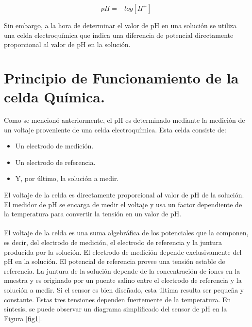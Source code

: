 \documentclass[10pt,a4paper]{article}
\begin{document}
\begin{equation}
	pH = -log\left[H^+\right]
\end{equation}

Sin embargo, a la hora de determinar el valor de pH en una solución se utiliza una celda electroquímica que indica una diferencia de potencial directamente proporcional al valor de pH en la solución.

\section{Principio de Funcionamiento de la celda Química.}

Como se mencionó anteriormente, el pH es determinado mediante la medición de un voltaje proveniente de una celda electroquímica. Esta celda consiste de:

\begin{itemize}
	\item {Un electrodo de medición.}
	\item {Un electrodo de referencia.}
	\item {Y, por último, la solución a medir.}
\end{itemize}

El voltaje de la celda es directamente proporcional al valor de pH de la solución. El medidor de pH se encarga de medir el voltaje y usa un factor dependiente de la temperatura para convertir la tensión en un valor de pH.\\
\\
El voltaje de la celda es una suma algebráfica de los potenciales que la componen, es decir, del electrodo de medición, el electrodo de referencia y la juntura producida por la solución. El electrodo de medición depende exclusivamente del pH en la solución. El potencial de referencia provee una tensión estable de referencia. La juntura de la solución depende de la concentración de iones en la muestra y es originado por un puente salino entre el electrodo de referencia y la solución a medir. Si el sensor es bien diseñado, esta última resulta ser pequeña y constante. Estas tres tensiones dependen fuertemente de la temperatura. En síntesis, se puede observar un diagrama simplificado del sensor de pH en la Figura \ref{fig1}.
\end{document}
